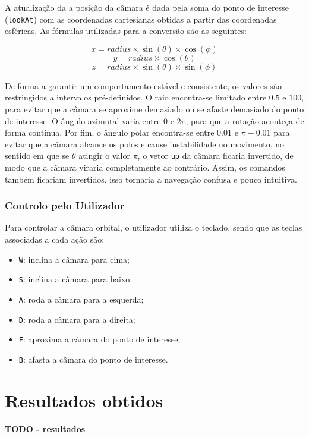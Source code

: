 \documentclass[12pt, a4paper]{article}
\begin{document}
A atualização da a posição da câmara é dada pela soma do ponto de interesse (\texttt{lookAt}) com
as coordenadas cartesianas obtidas a partir das coordenadas esféricas. As fórmulas utilizadas para
a conversão são as seguintes:

$$x = radius \times \sin(\theta) \times \cos(\phi)$$
$$y = radius \times \cos(\theta)$$
$$z = radius \times \sin(\theta) \times \sin(\phi)$$

De forma a garantir um comportamento estável e consistente, os valores são restringidos a
intervalos pré-definidos. O raio encontra-se limitado entre $0.5$ e $100$, para evitar que a câmara
se aproxime demasiado ou se afaste demasiado do ponto de interesse. O ângulo azimutal varia entre
$0$ e $2\pi$, para que a rotação aconteça de forma contínua. Por fim, o ângulo polar encontra-se
entre $0.01$ e $\pi - 0.01$ para evitar que a câmara alcance os polos e cause instabilidade no
movimento, no sentido em que se $\theta$ atingir o valor $\pi$, o vetor \texttt{up} da câmara
ficaria invertido, de modo que a câmara viraria completamente ao contrário. Assim, os comandos
também ficariam invertidos, isso tornaria a navegação confusa e pouco intuitiva.

\subsubsection{Controlo pelo Utilizador}

Para controlar a câmara orbital, o utilizador utiliza o teclado, sendo que as teclas associadas a
cada ação são:
\begin{itemize}
    \item \texttt{W}: inclina a câmara para cima;
    \item \texttt{S}: inclina a câmara para baixo;
    \item \texttt{A}: roda a câmara para a esquerda;
    \item \texttt{D}: roda a câmara para a direita;
    \item \texttt{F}: aproxima a câmara do ponto de interesse;
    \item \texttt{B}: afasta a câmara do ponto de interesse.
\end{itemize}

\section{Resultados obtidos}

\textbf{\color{red} TODO - resultados}
\end{document}
